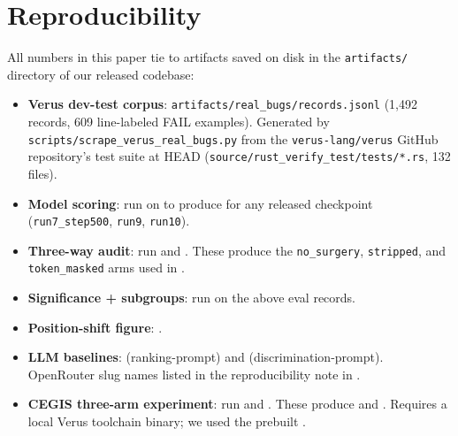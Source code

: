 \documentclass[10pt]{article}
\begin{document}
\section{Reproducibility}
\label{app:reproducibility}

All numbers in this paper tie to artifacts saved on disk in the
\texttt{artifacts/} directory of our released codebase:

\begin{itemize}[leftmargin=*,itemsep=2pt,topsep=2pt]
\item \textbf{Verus dev-test corpus}: \texttt{artifacts/real\_bugs/records.jsonl}
  (1{,}492 records, 609 line-labeled FAIL examples). Generated by
  \texttt{scripts/scrape\_verus\_real\_bugs.py} from the
  \texttt{verus-lang/verus} GitHub repository's test suite at HEAD
  (\texttt{source/rust\_verify\_test/tests/*.rs}, 132 files).
\item \textbf{Model scoring}: run 
  on  to produce
   for any released
  checkpoint (\texttt{run7\_step500}, \texttt{run9}, \texttt{run10}).
\item \textbf{Three-way audit}: run
   and
  . These produce the
  \texttt{no\_surgery}, \texttt{stripped}, and
  \texttt{token\_masked} arms used in
  .
\item \textbf{Significance + subgroups}: run
   on the above eval records.
\item \textbf{Position-shift figure}: .
\item \textbf{LLM baselines}: 
  (ranking-prompt) and 
  (discrimination-prompt). OpenRouter slug names listed in the
  reproducibility note in .
\item \textbf{CEGIS three-arm experiment}: run
   and
  . These produce
   and
  . Requires a local Verus toolchain
  binary; we used the prebuilt
  .
\end{itemize}
\end{document}
